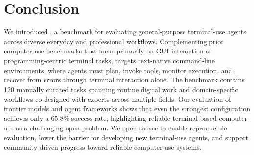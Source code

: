 \section{Conclusion}\label{sec:conclusion}

We introduced \benchname, a benchmark for evaluating general-purpose terminal-use agents across diverse everyday and professional workflows. Complementing prior computer-use benchmarks that focus primarily on GUI interaction or programming-centric terminal tasks, \benchname targets text-native command-line environments, where agents must plan, invoke tools, monitor execution, and recover from errors through terminal interaction alone. The benchmark contains 120 manually curated tasks spanning routine digital work and domain-specific workflows co-designed with experts across multiple fields. Our evaluation of frontier models and agent frameworks shows that even the strongest configuration achieves only a 65.8\% success rate, highlighting reliable terminal-based computer use as a challenging open problem. We open-source \benchname to enable reproducible evaluation, lower the barrier for developing new terminal-use agents, and support community-driven progress toward reliable computer-use systems.

